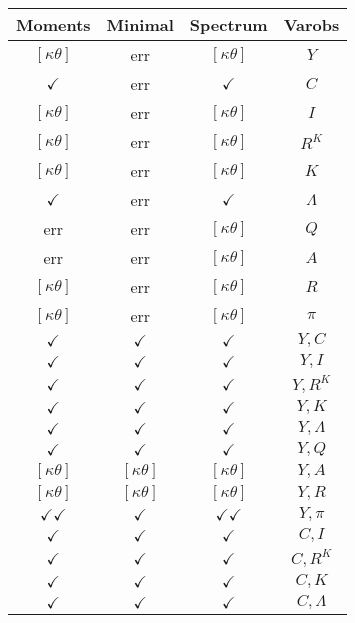 \documentclass[a4paper,10pt]{article}
\begin{document}
\centering
\begin{longtable}{|c|c|c|c|}
\hline
Moments & Minimal & Spectrum & Varobs \\
\hline
$[\kappa \theta ]$ & err & $[\kappa \theta ]$ & ${Y}$ \\
\hline
$\checkmark$ & err & $\checkmark$ & ${C}$ \\
\hline
$[\kappa \theta ]$ & err & $[\kappa \theta ]$ & ${I}$ \\
\hline
$[\kappa \theta ]$ & err & $[\kappa \theta ]$ & ${R^{K}}$ \\
\hline
$[\kappa \theta ]$ & err & $[\kappa \theta ]$ & ${K}$ \\
\hline
$\checkmark$ & err & $\checkmark$ & ${\Lambda}$ \\
\hline
err & err & $[\kappa \theta ]$ & ${Q}$ \\
\hline
err & err & $[\kappa \theta ]$ & ${A}$ \\
\hline
$[\kappa \theta ]$ & err & $[\kappa \theta ]$ & ${R}$ \\
\hline
$[\kappa \theta ]$ & err & $[\kappa \theta ]$ & ${\pi}$ \\
\hline
$\checkmark$ & $\checkmark$ & $\checkmark$ & ${Y},{C}$ \\
\hline
$\checkmark$ & $\checkmark$ & $\checkmark$ & ${Y},{I}$ \\
\hline
$\checkmark$ & $\checkmark$ & $\checkmark$ & ${Y},{R^{K}}$ \\
\hline
$\checkmark$ & $\checkmark$ & $\checkmark$ & ${Y},{K}$ \\
\hline
$\checkmark$ & $\checkmark$ & $\checkmark$ & ${Y},{\Lambda}$ \\
\hline
$\checkmark$ & $\checkmark$ & $\checkmark$ & ${Y},{Q}$ \\
\hline
$[\kappa \theta ]$ & $[\kappa \theta ]$ & $[\kappa \theta ]$ & ${Y},{A}$ \\
\hline
$[\kappa \theta ]$ & $[\kappa \theta ]$ & $[\kappa \theta ]$ & ${Y},{R}$ \\
\hline
$\checkmark\checkmark$ & $\checkmark$ & $\checkmark\checkmark$ & ${Y},{\pi}$ \\
\hline
$\checkmark$ & $\checkmark$ & $\checkmark$ & ${C},{I}$ \\
\hline
$\checkmark$ & $\checkmark$ & $\checkmark$ & ${C},{R^{K}}$ \\
\hline
$\checkmark$ & $\checkmark$ & $\checkmark$ & ${C},{K}$ \\
\hline
$\checkmark$ & $\checkmark$ & $\checkmark$ & ${C},{\Lambda}$ \\

\end{longtable}
\end{document}
